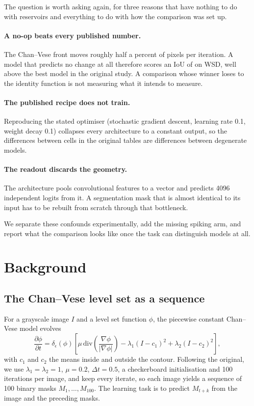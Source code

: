 \documentclass[11pt,a4paper]{article}
\begin{document}
The question is worth asking again, for three reasons that have nothing to do
with reservoirs and everything to do with how the comparison was set up.

\paragraph{A no-op beats every published number.}
The Chan--Vese front moves roughly half a percent of pixels per iteration. A
model that predicts no change at all therefore scores an IoU of
\Awsdcopyiou{} on WSD, well above the best model in the original study. A
comparison whose winner loses to the identity function is not measuring what it
intends to measure.

\paragraph{The published recipe does not train.}
Reproducing the stated optimiser (stochastic gradient descent, learning rate
0.1, weight decay 0.1) collapses every architecture to a constant output, so
the differences between cells in the original tables are differences between
degenerate models.

\paragraph{The readout discards the geometry.}
The architecture pools convolutional features to a vector and predicts 4096
independent logits from it. A segmentation mask that is almost identical to its
input has to be rebuilt from scratch through that bottleneck.

We separate these confounds experimentally, add the missing spiking arm, and
report what the comparison looks like once the task can distinguish models at
all.

\section{Background}

\subsection{The Chan--Vese level set as a sequence}

For a grayscale image $I$ and a level set function $\phi$, the piecewise
constant Chan--Vese model evolves
\begin{equation}
\frac{\partial \phi}{\partial t} = \delta_\epsilon(\phi)
\left[ \mu \, \mathrm{div}\!\left(\frac{\nabla \phi}{|\nabla \phi|}\right)
- \lambda_1 (I - c_1)^2 + \lambda_2 (I - c_2)^2 \right],
\end{equation}
with $c_1$ and $c_2$ the means inside and outside the contour. Following the
original, we use $\lambda_1 = \lambda_2 = 1$, $\mu = 0.2$, $\Delta t = 0.5$, a
checkerboard initialisation and 100 iterations per image, and keep every
iterate, so each image yields a sequence of 100 binary masks
$M_1, \dots, M_{100}$. The learning task is to predict $M_{t+k}$ from the image
and the preceding masks.
\end{document}
